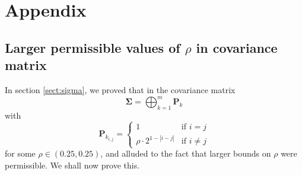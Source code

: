 \documentclass[11pt, letterpaper]{article}
\begin{document}
\section{Appendix}
\subsection{Larger permissible values of $\rho$ in covariance matrix}
In section \ref{sect:sigma}, we proved that in the covariance matrix $$\bm \Sigma = \bigoplus^m_{k=1} \bm P_k$$
with 
$$\bm P_{k_{i,j}}  = \begin{cases}
1 & \text{if } i = j \\
\rho \cdot 2 ^{1-|i-j|} & \text{if } i \neq j 
\end{cases}$$
for some $\rho \in (0.25,0.25)$, and alluded to the fact that larger bounds on $\rho$ were permissible. We shall now prove this. 
\end{document}
